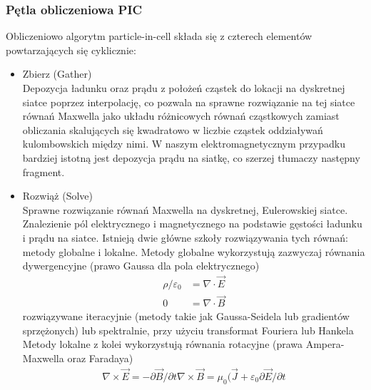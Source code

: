     \subsubsection{Pętla obliczeniowa PIC}
    Obliczeniowo algorytm particle-in-cell składa się z czterech elementów
    powtarzających się cyklicznie:
    \begin{itemize}
        \item Zbierz (Gather)\\
    Depozycja ładunku oraz prądu z położeń cząstek do lokacji na dyskretnej
    siatce poprzez interpolację, co pozwala na sprawne rozwiązanie na tej
    siatce równań Maxwella jako układu różnicowych równań cząstkowych zamiast
    obliczania skalujących się kwadratowo w liczbie cząstek oddziaływań
    kulombowskich między nimi.  W naszym elektromagnetycznym przypadku bardziej
    istotną jest depozycja prądu na siatkę, co szerzej tłumaczy następny
    fragment.
    \item Rozwiąż (Solve)\\
    Sprawne rozwiązanie równań Maxwella na dyskretnej, Eulerowskiej siatce.
    Znalezienie pól elektrycznego i magnetycznego na podstawie gęstości ładunku
    i prądu na siatce.  Istnieją dwie główne szkoły rozwiązywania tych równań:
    metody globalne i lokalne. Metody globalne wykorzystują zazwyczaj równania
    dywergencyjne (prawo Gaussa dla pola elektrycznego)
    \begin{align}
        \label{poisson}
        \rho / \varepsilon_0 &= \nabla \cdot \vec{E} \\
        \label{gauss}
        0 &= \nabla \cdot \vec{B}
    \end{align}
    rozwiązywane iteracyjnie (metody takie jak Gaussa-Seidela lub gradientów
    sprzężonych)
     lub spektralnie, przy użyciu transformat Fouriera lub Hankela \cite{fbpic}
     Metody lokalne z kolei
    wykorzystują równania rotacyjne (prawa Ampera-Maxwella oraz Faradaya)
    \begin{align}
        \nabla \times \vec{E} = -\partial \vec{B} / \partial t
        \nabla \times \vec{B} = \mu_0 \Big( \vec{J} + \varepsilon_0 \partial \vec{E} / \partial t
        \label{rotation-equations}
    \end{align}


\end{itemize}
